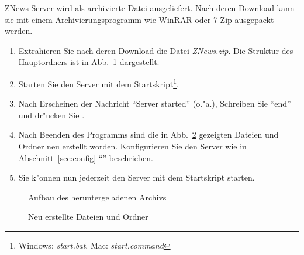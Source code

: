 ZNews Server wird als archivierte Datei ausgeliefert.
Nach deren Download kann sie mit einem Archivierungsprogramm
wie WinRAR oder 7-Zip ausgepackt werden.

\begin{enumerate}
    \item Extrahieren Sie nach deren Download die Datei \emph{ZNews.zip}.
    Die Struktur des Hauptordners ist in Abb.~\ref{fig:dirtree1} dargestellt.
    \item Starten Sie den Server mit dem Startskript\footnote{%
    Windows: \emph{start.bat}, Mac: \emph{start.command}}.
    \item Nach Erscheinen der Nachricht ``Server started'' (o."a.),
    Schreiben Sie ``end'' und dr"ucken Sie .
    \item Nach Beenden des Programms sind die in Abb.~\ref{fig:dirtree2}
    gezeigten Dateien und Ordner neu erstellt worden.
    Konfigurieren Sie den Server wie in Abschnitt~\ref{sec:config} ``'' beschrieben.
    \item Sie k"onnen nun jederzeit den Server mit dem Startskript starten.
\end{enumerate}

\begin{figure}[htb]
    \caption{\label{fig:dirtree1}Aufbau des heruntergeladenen Archivs}
\end{figure}

\begin{figure}[htb]
    \caption{\label{fig:dirtree2}Neu erstellte Dateien und Ordner}
\end{figure}
